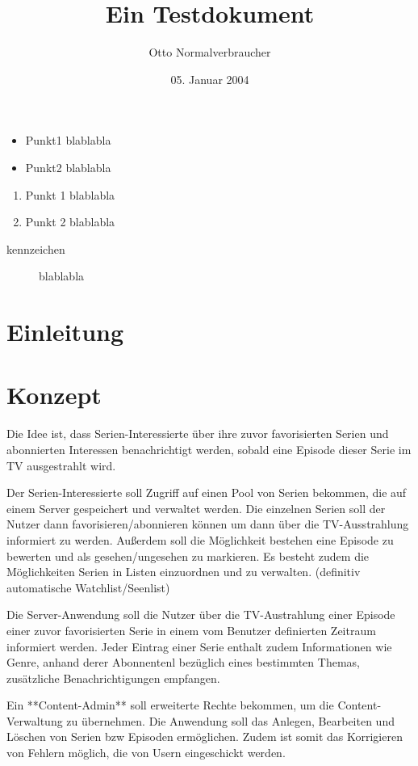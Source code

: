 \documentclass[a4paper]{article}
\title{Ein Testdokument}
\author{Otto Normalverbraucher}
\date{05. Januar 2004}
\begin{document}
\maketitle
\tableofcontents


\begin{itemize}
\item
Punkt1 blablabla
\item
Punkt2 blablabla
\end{itemize}

\begin{enumerate}
\item
Punkt 1 blablabla
\item
Punkt 2 blablabla
\end{enumerate}

\begin{description}
\item[kennzeichen]
blablabla
\end{description}

\section{Einleitung}


\section{Konzept}

Die Idee ist, dass Serien-Interessierte über ihre zuvor favorisierten Serien und abonnierten Interessen benachrichtigt werden, sobald eine Episode dieser Serie im TV ausgestrahlt wird.

Der Serien-Interessierte soll Zugriff auf einen Pool von Serien bekommen, die auf einem Server gespeichert und verwaltet werden.  
Die einzelnen Serien soll der Nutzer dann favorisieren/abonnieren können um dann über die TV-Ausstrahlung informiert zu werden.
Außerdem soll die Möglichkeit bestehen eine Episode zu bewerten und als gesehen/ungesehen zu markieren. Es besteht zudem die Möglichkeiten Serien in Listen einzuordnen und zu verwalten. (definitiv automatische Watchlist/Seenlist)

Die Server-Anwendung soll die Nutzer über die TV-Austrahlung einer Episode einer zuvor favorisierten Serie in einem vom Benutzer definierten Zeitraum informiert werden. Jeder Eintrag einer Serie enthalt zudem Informationen wie Genre, anhand derer Abonnentenl bezüglich eines bestimmten Themas, zusätzliche Benachrichtigungen empfangen.

Ein **Content-Admin** soll erweiterte Rechte bekommen, um die Content-Verwaltung zu übernehmen. Die Anwendung soll das Anlegen, Bearbeiten und Löschen von Serien bzw Episoden ermöglichen. Zudem ist somit das Korrigieren von Fehlern möglich, die von Usern eingeschickt werden.
\end{document}
